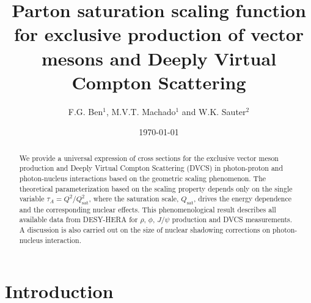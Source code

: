 \documentclass[twocolumn,showpacs,preprintnumbers,amsmath,amssymb,showkeys,aps,prd,a4paper,byrevtex]{revtex4}
\begin{document}

\newcommand{\qs}{Q_{\rm sat}}
\newcommand{\qsa}{Q_{\rm sat, A}}
\newcommand{\rr}{\mbox{\boldmath $r$}}
\newcommand{\rrn}{\mbox{$r$}} 
\newcommand{\pom}{I\!\!P} 
\newcommand{\rp}{\mbox{\boldmath $p$}} 
\newcommand{\rqq}{\mbox{\boldmath $q$}} 
\newcommand{\lsim}{\raisebox{-0.5mm}{$\stackrel{<}{\scriptstyle{\sim}}$}}
\newcommand{\gsim}{\raisebox{-0.5mm}{$\stackrel{>}{\scriptstyle{\sim}}$}}
\def\simge{\mathrel{%
   \rlap{\raise 0.511ex \hbox{$>$}}{\lower 0.511ex \hbox{$\sim$}}}}
\def\simle{\mathrel{
   \rlap{\raise 0.511ex \hbox{$<$}}{\lower 0.511ex \hbox{$\sim$}}}}



\title{Parton saturation scaling function for exclusive production of vector mesons and Deeply Virtual Compton Scattering}
\author{F.G. Ben$^{1}$, M.V.T. Machado$^{1}$ and W.K. Sauter$^{2}$}



\date{\today}

\begin{abstract}
We provide a universal expression of cross sections for the exclusive vector meson production and Deeply Virtual Compton Scattering (DVCS) in photon-proton and photon-nucleus interactions based on the geometric scaling phenomenon. The theoretical parameterization based on the scaling property depends only  on the single variable $\tau_A = Q^2/Q_{\mathrm{sat}}^2$, where the saturation scale, $Q_{\mathrm{sat}}$, drives the energy dependence and the corresponding nuclear effects. This phenomenological result describes all available data from  DESY-HERA for $\rho,\,\phi,\,J/\psi$ production and DVCS measurements. A discussion is also carried out on the size of nuclear shadowing corrections on photon-nucleus interaction.
\end{abstract}
\maketitle

\section{Introduction \label{sec:intro}}
\end{document}
